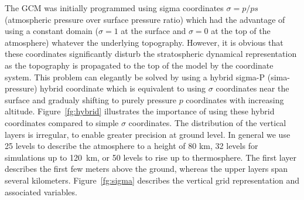The GCM was initially programmed using sigma coordinates $\sigma = p/ps$
(atmospheric pressure over surface pressure ratio)
which had the advantage of using a constant domain
($\sigma=1$ at the surface and $\sigma=0$ at the top of the atmosphere)
whatever the underlying topography.
However, it is obvious that these coordinates significantly disturb
the stratospheric dynamical representation as the topography is propagated
to the top of the model by the coordinate system.
This problem can elegantly be solved by using a hybrid sigma-P (sima-pressure)
hybrid coordinate which is equivalent to using $\sigma$ coordinates
near the surface and gradualy shifting to purely pressure $p$ 
coordinates with increasing altitude.
Figure~\ref{fg:hybrid} illustrates the importance of using these
hybrid coordinates compared to simple $\sigma$ coordinates.
The distribution of the vertical layers is irregular,
to enable greater precision at ground level.
In general we use 25 levels to describe the atmosphere to a height of 80 km,
32 levels for simulations up to 120~km, or 50 levels to rise 
up to thermosphere.
The first layer describes the first few meters above the ground,
whereas the upper layers span several kilometers.
Figure~\ref{fg:sigma} describes the vertical grid representation
and associated variables.

